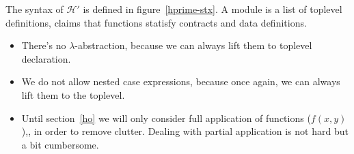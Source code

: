 \documentclass[preprint]{sigplanconf}
\begin{document}
The syntax of $\mathcal{H}'$ is defined in figure~\ref{hprime-stx}. A module
is a list of toplevel definitions, claims that functions statisfy
contracts and data definitions.

\begin{itemize}
\item There's no $\lambda$-abstraction, because we can always lift
  them to toplevel declaration.
\item We do not allow nested case expressions, because once again, we
  can always lift them to the toplevel.
\item Until section~\ref{ho} we will only consider full application of
  functions ($f(x,y)$),, in order to remove clutter. Dealing with
  partial application is not hard but a bit cumbersome.
\end{itemize}
\end{document}
